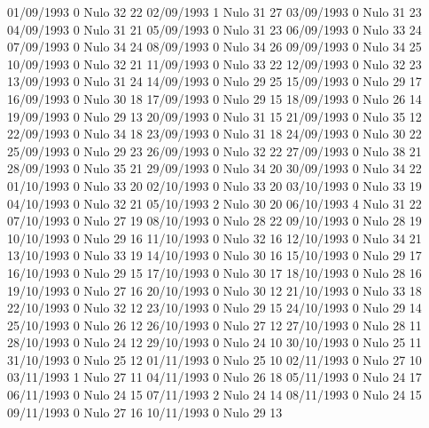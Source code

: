 01/09/1993  0     Nulo    32     22 
02/09/1993  1     Nulo    31     27 
03/09/1993  0     Nulo    31     23 
04/09/1993  0     Nulo    31     21 
05/09/1993  0     Nulo    31     23 
06/09/1993  0     Nulo    33     24 
07/09/1993  0     Nulo    34     24 
08/09/1993  0     Nulo    34     26 
09/09/1993  0     Nulo    34     25 
10/09/1993  0     Nulo    32     21 
11/09/1993  0     Nulo    33     22 
12/09/1993  0     Nulo    32     23 
13/09/1993  0     Nulo    31     24 
14/09/1993  0     Nulo    29     25 
15/09/1993  0     Nulo    29     17 
16/09/1993  0     Nulo    30     18 
17/09/1993  0     Nulo    29     15 
18/09/1993  0     Nulo    26     14 
19/09/1993  0     Nulo    29     13 
20/09/1993  0     Nulo    31     15 
21/09/1993  0     Nulo    35     12 
22/09/1993  0     Nulo    34     18 
23/09/1993  0     Nulo    31     18 
24/09/1993  0     Nulo    30     22 
25/09/1993  0     Nulo    29     23 
26/09/1993  0     Nulo    32     22 
27/09/1993  0     Nulo    38     21 
28/09/1993  0     Nulo    35     21 
29/09/1993  0     Nulo    34     20 
30/09/1993  0     Nulo    34     22 
01/10/1993  0     Nulo    33     20 
02/10/1993  0     Nulo    33     20 
03/10/1993  0     Nulo    33     19 
04/10/1993  0     Nulo    32     21 
05/10/1993  2     Nulo    30     20 
06/10/1993  4     Nulo    31     22 
07/10/1993  0     Nulo    27     19 
08/10/1993  0     Nulo    28     22 
09/10/1993  0     Nulo    28     19 
10/10/1993  0     Nulo    29     16 
11/10/1993  0     Nulo    32     16 
12/10/1993  0     Nulo    34     21 
13/10/1993  0     Nulo    33     19 
14/10/1993  0     Nulo    30     16 
15/10/1993  0     Nulo    29     17 
16/10/1993  0     Nulo    29     15 
17/10/1993  0     Nulo    30     17 
18/10/1993  0     Nulo    28     16 
19/10/1993  0     Nulo    27     16 
20/10/1993  0     Nulo    30     12 
21/10/1993  0     Nulo    33     18 
22/10/1993  0     Nulo    32     12 
23/10/1993  0     Nulo    29     15 
24/10/1993  0     Nulo    29     14 
25/10/1993  0     Nulo    26     12 
26/10/1993  0     Nulo    27     12 
27/10/1993  0     Nulo    28     11 
28/10/1993  0     Nulo    24     12 
29/10/1993  0     Nulo    24     10 
30/10/1993  0     Nulo    25     11 
31/10/1993  0     Nulo    25     12 
01/11/1993  0     Nulo    25     10 
02/11/1993  0     Nulo    27     10 
03/11/1993  1     Nulo    27     11 
04/11/1993  0     Nulo    26     18 
05/11/1993  0     Nulo    24     17 
06/11/1993  0     Nulo    24     15 
07/11/1993  2     Nulo    24     14 
08/11/1993  0     Nulo    24     15 
09/11/1993  0     Nulo    27     16 
10/11/1993  0     Nulo    29     13 
